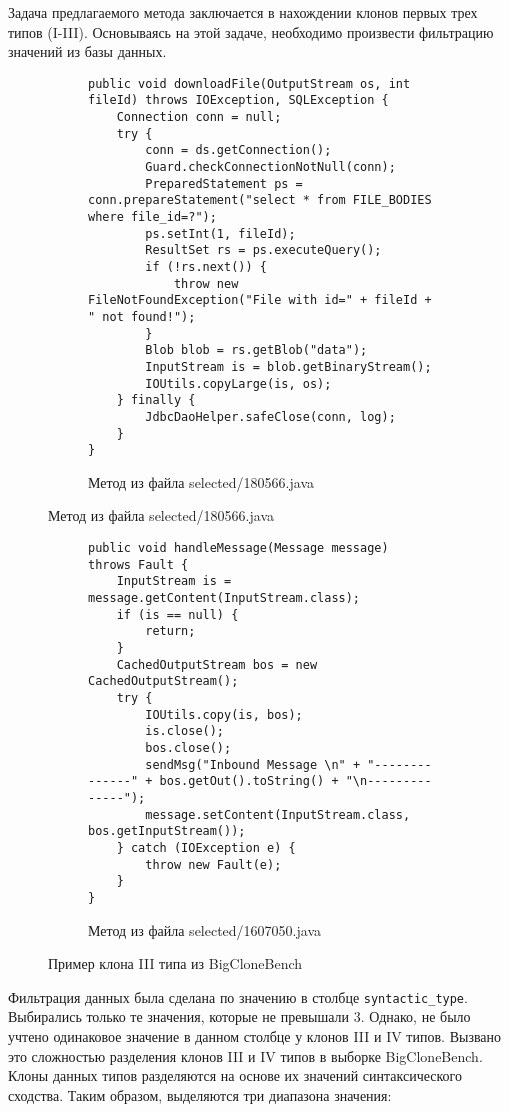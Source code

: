 Задача предлагаемого метода заключается в нахождении клонов первых трех типов (I-III). Основываясь на этой задаче, необходимо произвести фильтрацию значений из базы данных. 

\begin{figure}[H]
\begin{subfigure}{\textwidth}
\begin{lstlisting}[style=java]
public void downloadFile(OutputStream os, int fileId) throws IOException, SQLException {
    Connection conn = null;
    try {
        conn = ds.getConnection();
        Guard.checkConnectionNotNull(conn);
        PreparedStatement ps = conn.prepareStatement("select * from FILE_BODIES where file_id=?");
        ps.setInt(1, fileId);
        ResultSet rs = ps.executeQuery();
        if (!rs.next()) {
            throw new FileNotFoundException("File with id=" + fileId + " not found!");
        }
        Blob blob = rs.getBlob("data");
        InputStream is = blob.getBinaryStream();
        IOUtils.copyLarge(is, os);
    } finally {
        JdbcDaoHelper.safeClose(conn, log);
    }
}
\end{lstlisting}
\caption{Метод из файла selected/180566.java}
\end{subfigure}
\end{figure}
\begin{figure}[H]\ContinuedFloat
\begin{subfigure}{\textwidth}
\begin{lstlisting}[style=java]
public void handleMessage(Message message) throws Fault {
    InputStream is = message.getContent(InputStream.class);
    if (is == null) {
        return;
    }
    CachedOutputStream bos = new CachedOutputStream();
    try {
        IOUtils.copy(is, bos);
        is.close();
        bos.close();
        sendMsg("Inbound Message \n" + "--------------" + bos.getOut().toString() + "\n--------------");
        message.setContent(InputStream.class, bos.getInputStream());
    } catch (IOException e) {
        throw new Fault(e);
    }
}
\end{lstlisting}
\caption{Метод из файла selected/1607050.java }
\end{subfigure}
\caption{Пример клона III типа из BigCloneBench}
\label{fig:third}
\end{figure}

Фильтрация данных была сделана по значению в столбце \texttt{syntactic\_type}. Выбирались только те значения, которые не превышали 3. Однако, не было учтено одинаковое значение в данном столбце у клонов III и IV типов. Вызвано это сложностью разделения клонов III и IV типов в выборке BigCloneBench. Клоны данных типов разделяются на основе их значений синтаксического сходства. Таким образом, выделяются три диапазона значения:

